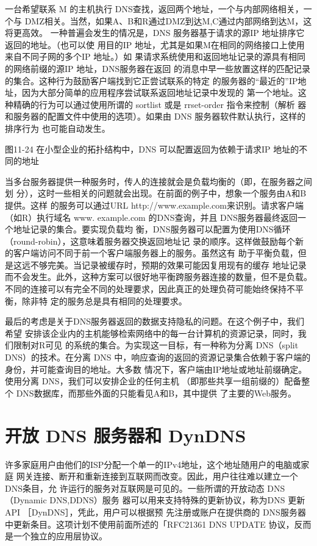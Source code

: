 一台希望联系 M 的主机执行 DNS查找，返回两个地址，一个与内部网络相关，一个与
DMZ相关。当然，如果A、B和R通过DMZ到达M,C通过内部网络到达M，这将更高效。
一种普遍会发生的情况是，DNS 服务器基于请求的源IP 地址排序它返回的地址。（也可以使
用目的IP 地址，尤其是如果M在相同的网络接口上使用来自不同子网的多个IP 地址。）如
果请求系统使用和返回地址记录的源具有相同的网络前缀的源IP 地址，DNS服务器在返回
的消息中早一些放置这样的匹配记录的集合。这种行为鼓励客户端找到它正尝试联系的特定
的服务器的“最近的”IP地址，因为大部分简单的应用程序尝试联系返回地址记录中发现的
第一个地址。这种精确的行为可以通过使用所谓的 sortlist 或是 rrset-order 指令来控制（解析
器和服务器的配置文件中使用的选项）。如果由 DNS 服务器软件默认执行，这样的排序行为
也可能自动发生。

图11-24 在小型企业的拓扑结构中，DNS 可以配置返回为依赖于请求IP 地址的不同的地址

当多台服务器提供一种服务时，传人的连接就会是负载均衡的（即，在服务器之间划
分），这时一些相关的问题就会出现。在前面的例子中，想象一个服务由A和B提供。这样
的服务可以通过URL http://www.example.com来识别。请求客户端（如R）执行域名 www.
example.com 的DNS查询，并且 DNS服务器最终返回一个地址记录的集合。要实现负载均
衡，DNS服务器可以配置为使用DNS循环（round-robin），这意味着服务器交换返回地址记
录的顺序。这样做鼓励每个新的客户端访问不同于前一个客户端服务器上的服务。虽然这有
助于平衡负载，但是这远不够完美。当记录被缓存时，预期的效果可能因复用现有的缓存
地址记录而不会发生。此外，这种方案可以很好地平衡跨服务器连接的数量，但不是负载。
不同的连接可以有完全不同的处理要求，因此真正的处理负荷可能始终保持不平衡，除非特
定的服务总是具有相同的处理要求。

最后的考虑是关于DNS服务器返回的数据支持隐私的问题。在这个例子中，我们希望
安排该企业内的主机能够检索网络中的每一台计算机的资源记录，同时，我们限制对R可见
的系统的集合。为实现这一目标，有一种称为分离 DNS（split DNS）的技术。在分离 DNS
中，响应查询的返回的资源记录集合依赖于客户端的身份，并可能查询目的地址。大多数
情况下，客户端由IP地址或地址前缀确定。使用分离 DNS，我们可以安排企业的任何主机
（即那些共享一组前缀的）配备整个 DNS数据库，而那些外面的只能看见A和B，其中提供
了主要的Web服务。

\section{开放 DNS 服务器和 DynDNS}

许多家庭用户由他们的ISP分配一个单一的IPv4地址，这个地址随用户的电脑或家庭
网关连接、断开和重新连接到互联网而改变。因此，用户往往难以建立一个 DNS条目，允
许运行的服务对互联网是可见的。一些所谓的开放动态 DNS（Dynamic DNS,DDNS）服务
器可以用来支持特殊的更新协议，称为DNS 更新 API ［DynDNS］，凭此，用户可以根据预
先注册或账户在提供商的 DNS服务器中更新条目。这项计划不使用前面所述的「RFC21361
DNS UPDATE 协议，反而是一个独立的应用层协议。

